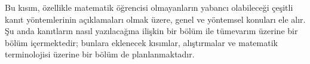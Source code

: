 \documentclass[../../include/open-logic-part]{subfiles}
\begin{document}

\begin{editorial}
  Bu kısım, özellikle matematik öğrencisi olmayanların yabancı
  olabileceği çeşitli kanıt yöntemlerinin açıklamaları olmak üzere,
  genel ve yöntemsel konuları ele alır. Şu anda kanıtların nasıl
  yazılacağına ilişkin bir bölüm ile tümevarım üzerine bir bölüm
  içermektedir; bunlara eklenecek kısımlar, alıştırmalar ve matematik
  terminolojisi üzerine bir bölüm de planlanmaktadır.
\end{editorial}



\OLEndPartHook
\end{document}
